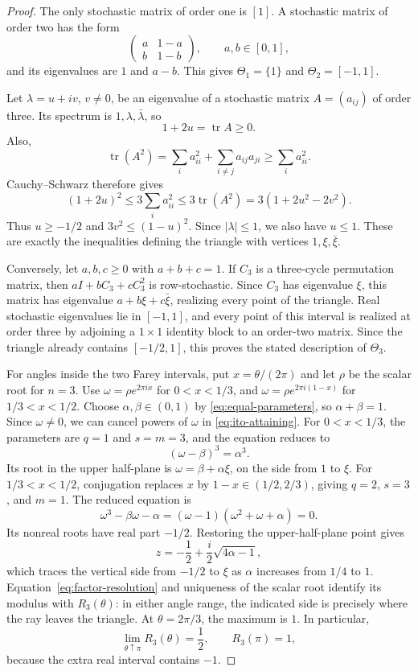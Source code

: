 \documentclass[11pt,a4paper]{article}
\theoremstyle{definition}
\theoremstyle{remark}
\numberwithin{equation}{section}
\begin{document}
\begin{proof}
The only stochastic matrix of order one is $[1]$. A stochastic matrix of order two has the form
\[
 \begin{pmatrix}a&1-a\\ b&1-b\end{pmatrix},\qquad a,b\in[0,1],
\]
and its eigenvalues are $1$ and $a-b$. This gives $\Theta_1=\{1\}$ and $\Theta_2=[-1,1]$.

Let $\lambda=u+iv$, $v\ne0$, be an eigenvalue of a stochastic matrix $A=(a_{ij})$ of order three. Its spectrum is $1,\lambda,\bar\lambda$, so
\[
 1+2u=\operatorname{tr}A\ge0.
\]
Also,
\[
 \operatorname{tr}(A^2)=\sum_i a_{ii}^2+\sum_{i\ne j}a_{ij}a_{ji}
 \ge\sum_i a_{ii}^2.
\]
Cauchy--Schwarz therefore gives
\[
 (1+2u)^2\le3\sum_i a_{ii}^2\le3\operatorname{tr}(A^2)
 =3(1+2u^2-2v^2).
\]
Thus $u\ge-1/2$ and $3v^2\le(1-u)^2$. Since $|\lambda|\le1$, we also have $u\le1$. These are exactly the inequalities defining the triangle with vertices $1,\xi,\bar\xi$.

Conversely, let $a,b,c\ge0$ with $a+b+c=1$. If $C_3$ is a three-cycle permutation matrix, then $aI+bC_3+cC_3^2$ is row-stochastic. Since $C_3$ has eigenvalue $\xi$, this matrix has eigenvalue $a+b\xi+c\bar\xi$, realizing every point of the triangle. Real stochastic eigenvalues lie in $[-1,1]$, and every point of this interval is realized at order three by adjoining a $1\times1$ identity block to an order-two matrix. Since the triangle already contains $[-1/2,1]$, this proves the stated description of $\Theta_3$.

For angles inside the two Farey intervals, put $x=\theta/(2\pi)$ and let $\rho$ be the scalar root for $n=3$. Use $\omega=\rho e^{2\pi ix}$ for $0<x<1/3$, and $\omega=\rho e^{2\pi i(1-x)}$ for $1/3<x<1/2$. Choose $\alpha,\beta\in(0,1)$ by \eqref{eq:equal-parameters}, so $\alpha+\beta=1$. Since $\omega\ne0$, we can cancel powers of $\omega$ in \eqref{eq:ito-attaining}.
For $0<x<1/3$, the parameters are $q=1$ and $s=m=3$, and the equation reduces to
\[
 (\omega-\beta)^3=\alpha^3.
\]
Its root in the upper half-plane is $\omega=\beta+\alpha\xi$, on the side from $1$ to $\xi$.
For $1/3<x<1/2$, conjugation replaces $x$ by $1-x\in(1/2,2/3)$, giving $q=2$, $s=3$, and $m=1$. The reduced equation is
\[
 \omega^3-\beta\omega-\alpha
 =(\omega-1)(\omega^2+\omega+\alpha)=0.
\]
Its nonreal roots have real part $-1/2$. Restoring the upper-half-plane point gives
\[
 z=-\frac12+\frac{i}{2}\sqrt{4\alpha-1},
\]
which traces the vertical side from $-1/2$ to $\xi$ as $\alpha$ increases from $1/4$ to $1$.
Equation~\eqref{eq:factor-resolution} and uniqueness of the scalar root identify its modulus with $R_3(\theta)$: in either angle range, the indicated side is precisely where the ray leaves the triangle. At $\theta=2\pi/3$, the maximum is $1$. In particular,
\[
 \lim_{\theta\uparrow\pi}R_3(\theta)=\frac12,
 \qquad R_3(\pi)=1,
\]
because the extra real interval contains $-1$.


\end{proof}
\end{document}
